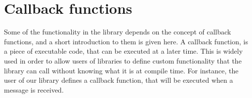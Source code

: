 \section{Callback functions}
Some of the functionality in the library depends on the concept of callback functions, and a short introduction to them is given here.
A callback function, is a piece of executable code, that can be executed at a later time. This is widely used in order to allow users of libraries to define custom functionality that the library can call without knowing what it is at compile time. For instance, the user of our library defines a callback function, that will be executed when a message is received.